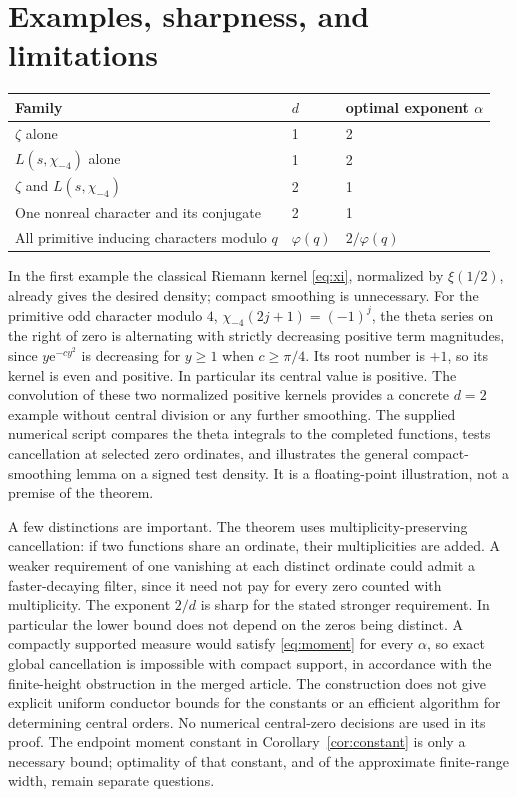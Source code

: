 \documentclass[11pt]{article}
\theoremstyle{remark}\newtheorem{remark}[theorem]{Remark}
\newcommand{\ee}{\mathrm e}\newcommand{\abs}[1]{\lvert#1\rvert}
\begin{document}
\section{Examples, sharpness, and limitations}
\begin{center}
\begin{tabular}{@{}lll@{}}
\toprule
Family & $d$ & optimal exponent $\alpha$\\\midrule
$\zeta$ alone & 1 & 2\\
$L(s,\chi_{-4})$ alone & 1 & 2\\
$\zeta$ and $L(s,\chi_{-4})$ & 2 & 1\\
One nonreal character and its conjugate & 2 & 1\\
All primitive inducing characters modulo $q$ & $\varphi(q)$ & $2/\varphi(q)$\\
\bottomrule
\end{tabular}
\end{center}
In the first example the classical Riemann kernel \eqref{eq:xi}, normalized by $\xi(1/2)$, already gives the desired density; compact smoothing is unnecessary. For the primitive odd character modulo $4$, $\chi_{-4}(2j+1)=(-1)^j$, the theta series on the right of zero is alternating with strictly decreasing positive term magnitudes, since $y\ee^{-cy^2}$ is decreasing for $y\ge1$ when $c\ge\pi/4$. Its root number is $+1$, so its kernel is even and positive. In particular its central value is positive. The convolution of these two normalized positive kernels provides a concrete $d=2$ example without central division or any further smoothing. The supplied numerical script compares the theta integrals to the completed functions, tests cancellation at selected zero ordinates, and illustrates the general compact-smoothing lemma on a signed test density. It is a floating-point illustration, not a premise of the theorem.

A few distinctions are important. The theorem uses multiplicity-preserving cancellation: if two functions share an ordinate, their multiplicities are added. A weaker requirement of one vanishing at each distinct ordinate could admit a faster-decaying filter, since it need not pay for every zero counted with multiplicity. The exponent $2/d$ is sharp for the stated stronger requirement. In particular the lower bound does not depend on the zeros being distinct. A compactly supported measure would satisfy \eqref{eq:moment} for every $\alpha$, so exact global cancellation is impossible with compact support, in accordance with the finite-height obstruction in the merged article. The construction does not give explicit uniform conductor bounds for the constants or an efficient algorithm for determining central orders. No numerical central-zero decisions are used in its proof. The endpoint moment constant in Corollary~\ref{cor:constant} is only a necessary bound; optimality of that constant, and of the approximate finite-range width, remain separate questions.
\end{document}
